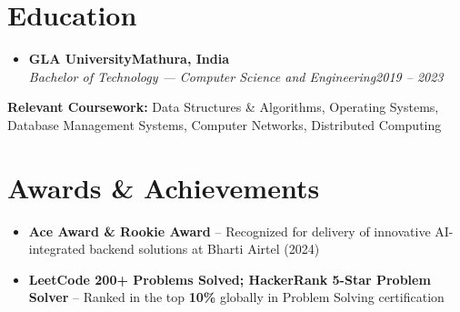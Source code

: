 \documentclass[letterpaper,11pt]{article}
\newcommand{\resumeSubheading}[4]{
  \vspace{-2pt}\item
    \textbf{#1}\hfill \textbf{\small #2} \\
    \textit{\small #3}\hfill \textit{\small #4}\vspace{-7pt}
}
\newcommand{\resumeSubHeadingListStart}{\begin{itemize}[leftmargin=0.0in, label={}]}
\newcommand{\resumeSubHeadingListEnd}{\end{itemize}}
\begin{document}
\section{Education}
  \resumeSubHeadingListStart
    \resumeSubheading
      {GLA University}{Mathura, India}
      {Bachelor of Technology --- Computer Science and Engineering}{2019 -- 2023}
  \resumeSubHeadingListEnd
  \vspace{-2pt}
  \begin{itemize}[leftmargin=0.15in, label={}]
    \small{\item{
      \textbf{Relevant Coursework:} Data Structures \& Algorithms, Operating Systems, Database Management Systems, Computer Networks, Distributed Computing
    }}
  \end{itemize}
\vspace{-4pt}

\section{Awards \& Achievements}
\begin{itemize}[leftmargin=0.15in]
  \item \small{\textbf{Ace Award \& Rookie Award} -- Recognized for delivery of innovative AI-integrated backend solutions at Bharti Airtel (2024)}
  \item \small{\textbf{LeetCode 200+ Problems Solved; HackerRank 5-Star Problem Solver} -- Ranked in the top \textbf{10\%} globally in Problem Solving certification}
\end{itemize}
\end{document}
